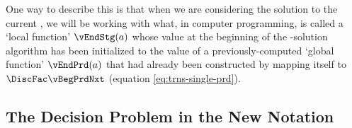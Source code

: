 One way to describe this is that when we are considering the solution to the current {\stg}, we will be working with what, in computer programming, is called a `local function' $\vEndStg(a)$ whose value at the beginning of the {\stg}-solution algorithm has been initialized to the value of a previously-computed `global function' $\vEndPrd(a)$ that had already been constructed by mapping itself to $\DiscFac \vBegPrdNxt$ (equation \eqref{eq:trns-single-prd}).
\hypertarget{decision-problem}{}

\subsection{The Decision Problem in the New Notation}\label{subsec:decision-problem}


